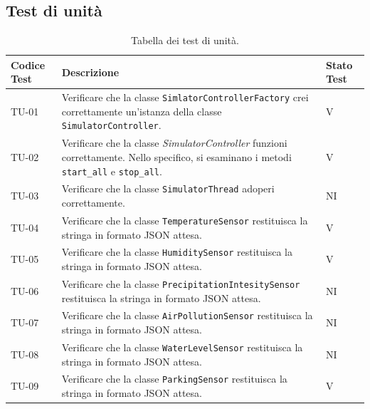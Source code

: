 \documentclass[8pt]{article}
\begin{document}
\subsection{Test di unità}
\renewcommand{\arraystretch}{2.5}
\begin{longtable}{|>{\centering}p{2cm}|>{\RaggedRight}m{12cm}|>{\centering\arraybackslash}p{2cm}|}
    \hline
    \rowcolor{white}
    \textbf{Codice Test} & \textbf{Descrizione} & \textbf{Stato Test} \\
    \hline
    \endfirsthead 
    \rowcolor{white}
    \caption{Tabella dei test di unità.} 
    \label{table:Tabella dei test di unità}
    \endlastfoot 
    
    TU-01 & Verificare che la classe \verb|SimlatorControllerFactory| crei correttamente un'istanza
    della classe \verb|SimulatorController|.  & V \\
    \hline

    TU-02 & Verificare che la classe \textit{SimulatorController} funzioni correttamente. Nello
    specifico, si esaminano i metodi \verb|start_all| e \verb|stop_all|.  & V \\
    \hline

    TU-03 & Verificare che la classe \verb|SimulatorThread| adoperi correttamente. & NI \\
    \hline

    TU-04 & Verificare che la classe \verb|TemperatureSensor| restituisca la stringa in formato JSON attesa. & V \\
    \hline

    TU-05 & Verificare che la classe \verb|HumiditySensor| restituisca la stringa in formato JSON attesa. & V \\
    \hline

    TU-06 & Verificare che la classe \verb|PrecipitationIntesitySensor| restituisca la stringa in formato JSON attesa. & NI \\
    \hline

    TU-07 & Verificare che la classe \verb|AirPollutionSensor| restituisca la stringa in formato JSON attesa. & NI \\
    \hline

    TU-08 & Verificare che la classe \verb|WaterLevelSensor| restituisca la stringa in formato JSON attesa. & NI \\
    \hline

    TU-09 & Verificare che la classe \verb|ParkingSensor| restituisca la stringa in formato JSON attesa. & V \\
    \hline


\end{longtable}
\end{document}
